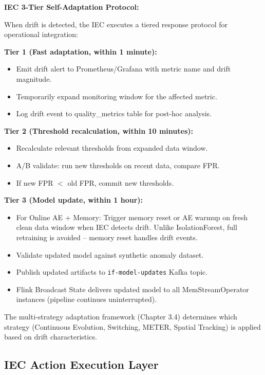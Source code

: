 \textbf{IEC 3-Tier Self-Adaptation Protocol:}

When drift is detected, the IEC executes a tiered response protocol for operational integration:

\textbf{Tier 1 (Fast adaptation, within 1 minute):}
\begin{itemize}
    \item Emit drift alert to Prometheus/Grafana with metric name and drift magnitude.
    \item Temporarily expand monitoring window for the affected metric.
    \item Log drift event to quality\_metrics table for post-hoc analysis.
\end{itemize}

\textbf{Tier 2 (Threshold recalculation, within 10 minutes):}
\begin{itemize}
    \item Recalculate relevant thresholds from expanded data window.
    \item A/B validate: run new thresholds on recent data, compare FPR.
    \item If new FPR $<$ old FPR, commit new thresholds.
\end{itemize}

\textbf{Tier 3 (Model update, within 1 hour):}
\begin{itemize}
    \item For Online AE + Memory: Trigger memory reset or AE warmup on fresh clean data window when IEC detects drift. Unlike IsolationForest, full retraining is avoided -- memory reset handles drift events.
    \item Validate updated model against synthetic anomaly dataset.
    \item Publish updated artifacts to \texttt{if-model-updates} Kafka topic.
    \item Flink Broadcast State delivers updated model to all MemStreamOperator instances (pipeline continues uninterrupted).
\end{itemize}

The multi-strategy adaptation framework (Chapter 3.4) determines which strategy (Continuous Evolution, Switching, METER, Spatial Tracking) is applied based on drift characteristics.

\subsection{IEC Action Execution Layer}

